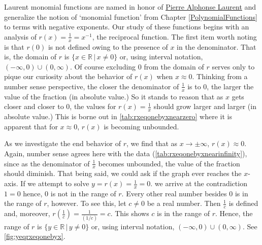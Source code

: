 Laurent monomial functions are named in honor of \href{https://en.wikipedia.org/wiki/Pierre_Alphonse_Laurent}{\underline{Pierre Alphonse Laurent}} and generalize the notion of `monomial function' from Chapter \ref{PolynomialFunctions} to terms with negative exponents. Our study of these functions begins with an analysis of   $r(x) = \frac{1}{x} = x^{-1}$, the reciprocal function. The first item worth  noting is that $r(0)$ is not defined owing to the presence of $x$  in the denominator.  That is, the domain of $r$ is $\{ x \in \mathbb{R} \, | \, x \neq 0\}$ or, using interval notation, $(-\infty, 0) \cup (0, \infty)$.   Of course excluding $0$ from the domain of $r$ serves only to pique our curiosity about the behavior of $r(x)$ when $x \approx 0$.  Thinking from a number sense perspective, the closer the denominator of $\frac{1}{x}$ is to $0$, the larger the value of the  fraction (in absolute value.)  So it stands to reason that as $x$ gets closer and closer to $0$, the values for $r(x) = \frac{1}{x}$ should grow larger and larger (in absolute value.)  This is borne out in \autoref{tab:rxeqonebyxnearzero} where it is apparent that for $x \approx 0$, $r(x)$ is becoming unbounded.  

As we investigate the end behavior of $r$, we find that as $x \rightarrow \pm \infty$, $r(x) \approx 0$. Again, number sense agrees here with the data (\autoref{tab:rxeqonebyxnearinfinity}), since as the denominator of $\frac{1}{x}$ becomes unbounded, the value of the fraction should diminish.  That being said, we could ask if the graph ever reaches the $x$-axis.  If we attempt to solve $y = r(x) = \frac{1}{x} = 0$. we arrive at the contradiction $1 = 0$ hence, $0$ is not in the range of $r$.  Every other real number besides $0$ is in the range of $r$, however.  To see this, let $c \neq 0$ be a real number.  Then $\frac{1}{c}$ is defined and, moreover, $r \left(\frac{1}{c} \right) = \frac{1}{(1/c)} = c$.  This shows $c$ is in the range of $r$.  Hence, the range of $r$ is $\{ y \in \mathbb{R} \, | \, y \neq 0\}$ or, using interval notation,  $(-\infty, 0) \cup (0, \infty)$. See \autoref{fig:yeqrxeqonebyx}.

